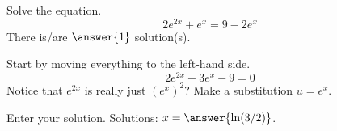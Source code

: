 \documentclass{ximera}
\author{Bobby Ramsey}
\begin{document}
\begin{exercise}
	Solve the equation.
	\[ 2e^{2x} + e^x  = 9 - 2 e^x \]
	There is/are $\answer{1}$ solution(s).
	\begin{hint}
		Start by moving everything to the left-hand side.  
		\[ 2e^{2x}+3e^x-9 = 0 \]
		Notice that $e^{2x}$ is really just $(e^x)^2$?  Make a substitution $u = e^x$.
	\end{hint}
	\begin{exercise}
		Enter your solution.
		Solutions: $x = \answer{ \ln(3/2) }$.
	\end{exercise}
\end{exercise}
\end{document}
